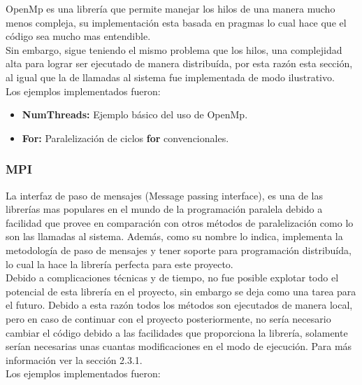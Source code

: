 \documentclass{article}
\begin{document}
OpenMp es una librería que permite manejar los hilos de una
manera mucho menos compleja, su implementación esta basada en
pragmas lo cual hace que el código sea mucho mas entendible.\\

Sin embargo, sigue teniendo el mismo problema que los hilos,
una complejidad alta para lograr ser ejecutado de manera
distribuída, por esta razón esta sección, al igual que la de
llamadas al sistema fue implementada de modo ilustrativo.\\

Los ejemplos implementados fueron:

\begin{itemize}
    \item \textbf{NumThreads:} Ejemplo básico del uso de OpenMp.
    \item \textbf{For:} Paralelización de ciclos \textbf{for}
        convencionales.
\end{itemize}

\subsubsection{MPI}

La interfaz de paso de mensajes (Message passing interface),
es una de las librerías mas populares en el mundo de la
programación paralela debido a facilidad que provee en
comparación con otros métodos de paralelización como lo son las
llamadas al sistema. Además, como su nombre lo indica, implementa
la metodología de paso de mensajes y tener soporte para
programación distribuída, lo cual la hace la librería perfecta
para este proyecto.\\

Debido a complicaciones técnicas y de tiempo, no fue posible
explotar todo el potencial de esta librería en el proyecto,
sin embargo se deja como una tarea para el futuro. Debido a esta
razón todos los métodos son ejecutados de manera local, pero
en caso de continuar con el proyecto posteriormente, no sería
necesario cambiar el código debido a las facilidades que
proporciona la librería, solamente serían necesarias unas
cuantas modificaciones en el modo de ejecución. Para más
información ver la sección 2.3.1.\\

Los ejemplos implementados fueron:
\end{document}
